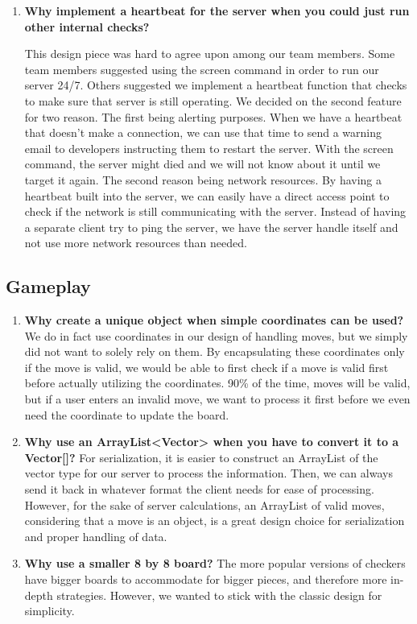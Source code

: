 \documentclass{scrreprt}
\begin{document}
\begin{enumerate} [label*=\arabic*.]
				\item \textbf{Why implement a heartbeat for the server when you could just run other internal checks?}

				This design piece was hard to agree upon among our team members. Some team members suggested using the screen command in order to run our server 24/7. Others suggested we implement a heartbeat function that checks to make sure that server is still operating. We decided on the second feature for two reason. The first being alerting purposes. When we have a heartbeat that doesn't make a connection, we can use that time to send a warning email to developers instructing them to restart the server. With the screen command, the server might died and we will not know about it until we target it again. The second reason being network resources. By having a heartbeat built into the server, we can easily have a direct access point to check if the network is still communicating with the server. Instead of having a separate client try to ping the server, we have the server handle itself and not use more network resources than needed.

			\end{enumerate}

		\subsection {Gameplay}
			\begin{enumerate}

			\item \textbf{Why create a unique object when simple coordinates can be used?}
			We do in fact use coordinates in our design of handling moves, but we simply did not want to solely rely on them. By encapsulating these coordinates only if the move is valid, we would be able to first check if a move is valid first before actually utilizing the coordinates. 90\% of the time, moves will be valid, but if a user enters an invalid move, we want to process it first before we even need the coordinate to update the board. 

			\item \textbf{Why use an ArrayList<Vector> when you have to convert it to a Vector[]?}
			For serialization, it is easier to construct an ArrayList of the vector type for our server to process the information. Then, we can always send it back in whatever format the client needs for ease of processing. However, for the sake of server calculations, an ArrayList of valid moves, considering that a move is an object, is a great design choice for serialization and proper handling of data.

			\item \textbf{Why use a smaller 8 by 8 board?}
			The more popular versions of checkers have bigger boards to accommodate for bigger pieces, and therefore more in-depth strategies. However, we wanted to stick with the classic design for simplicity.
			\end{enumerate}
\end{document}
